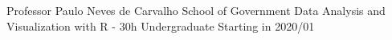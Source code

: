 \begin{cventries}

    \cventry
    {Professor Paulo Neves de Carvalho School of Government}
    {Data Analysis and Visualization with R - 30h}
    {Undergraduate}
    {Starting in 2020/01}
    {
      \begin{cvitems}
      \end{cvitems}
    }

\end{cventries}

